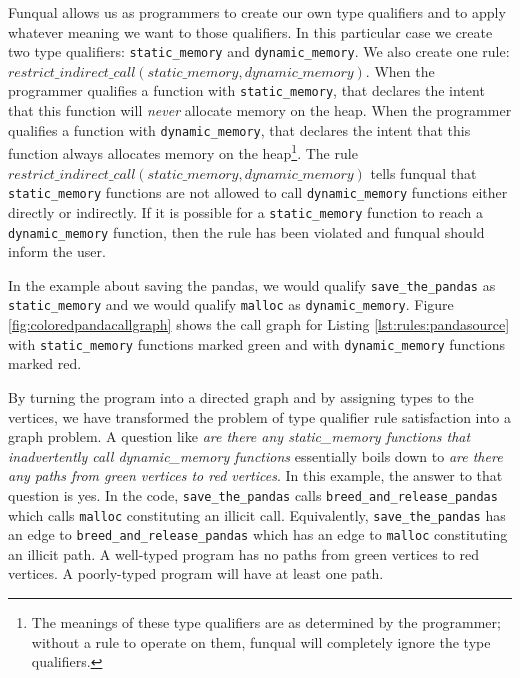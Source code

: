 \begin{sloppypar}
Funqual allows us as programmers to create our own type qualifiers and to apply whatever meaning we want to those qualifiers.  In this particular case we create two type qualifiers: \lstinline{static_memory} and \mbox{\lstinline{dynamic_memory}.} We also create one rule: $restrict\_indirect\_call(static\_memory, dynamic\_memory)$. When the programmer qualifies a function with \lstinline{static_memory}, that declares the intent that this function will \textit{never} allocate memory on the heap. When the programmer qualifies a function with \lstinline{dynamic_memory}, that declares the intent that this function always allocates memory on the heap\footnote{The meanings of these type qualifiers are as determined by the programmer; without a rule to operate on them, funqual will completely ignore the type qualifiers.}. The rule $restrict\_indirect\_call(static\_memory, dynamic\_memory)$ tells funqual that \lstinline{static_memory} functions are not allowed to call \lstinline{dynamic_memory} functions either directly or indirectly. If it is possible for a \lstinline{static_memory} function to reach a \lstinline{dynamic_memory} function, then the rule has been violated and funqual should inform the user.
\end{sloppypar}

In the example about saving the pandas, we would qualify \lstinline{save_the_pandas} as \lstinline{static_memory} and we would qualify \lstinline{malloc} as \lstinline{dynamic_memory}.  Figure \ref{fig:coloredpandacallgraph} shows the call graph for Listing \ref{lst:rules:pandasource} with \lstinline{static_memory} functions marked green and with \lstinline{dynamic_memory} functions marked red.



\begin{sloppypar}
By turning the program into a directed graph and by assigning types to the vertices, we have transformed the problem of type qualifier rule satisfaction into a graph problem.  A question like \textit{are there any static\_memory functions that inadvertently call dynamic\_memory functions} essentially boils down to \textit{are there any paths from green vertices to red vertices}.  In this example, the answer to that question is yes.  In the code, \lstinline{save_the_pandas} calls \lstinline{breed_and_release_pandas} which calls \lstinline{malloc} constituting an illicit call.  Equivalently, \lstinline{save_the_pandas} has an edge to \lstinline{breed_and_release_pandas} which has an edge to \lstinline{malloc} constituting an illicit path.  A well-typed program has no paths from green vertices to red vertices.  A poorly-typed program will have at least one path.  
\end{sloppypar}


